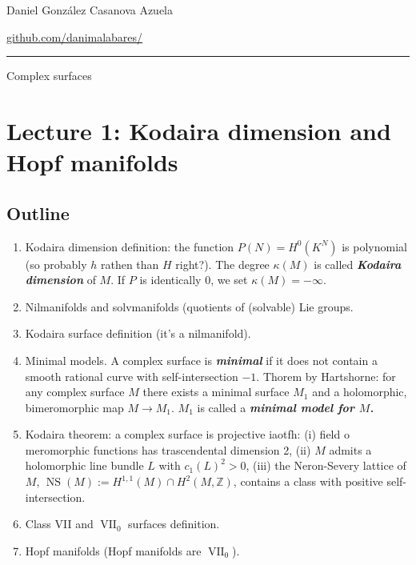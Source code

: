 
%




\begin{minipage}{\textwidth}
	\begin{minipage}{1\textwidth}
		 \hfill Daniel González Casanova Azuela
		
		{\small \hfill\href{https://github.com/danimalabares/}{github.com/danimalabares/}}
	\end{minipage}
\end{minipage}\vspace{.2cm}\hrule

\vspace{10pt}
{\huge Complex surfaces}

\section{Lecture 1: Kodaira dimension and Hopf manifolds}

\subsection{Outline}
\begin{enumerate}
\item Kodaira dimension definition: the function \(P(N)=H^{0}(K^N)\) is polynomial (so probably \(h\) rathen than \(H\) right?). The degree  \(\kappa(M)\) is called \textit{\textbf{Kodaira dimension}} of \(M\). If \(P\) is identically 0, we set \(\kappa(M)=-\infty\).
\item Nilmanifolds and solvmanifolds (quotients of (solvable) Lie groups.
\item Kodaira surface definition (it's a nilmanifold).
\item Minimal models. A complex surface is \textit{\textbf{minimal}} if it does not contain a smooth rational curve with self-intersection \(-1\). Thorem by Hartshorne: for any complex surface \(M\) there exists a minimal surface \(M_1\) and a holomorphic, bimeromorphic map \(M \to M_1\). \(M_1\) is called a \textit{\textbf{minimal model for \(M\).}}
\item Kodaira theorem: a complex surface is projective iaotfh: (i) field o meromorphic functions has trascendental dimension 2, (ii)  \(M\) admits a holomorphic line bundle \(L\) with \(c_1(L)^2>0\), (iii) the Neron-Severy lattice of \(M\), \(\operatorname{NS}(M):=H^{1,1}(M)\cap H^{2}(M,\mathbb{Z})\), contains a class with positive self-intersection. 
\item Class VII and \(\operatorname{V I I}_0\) surfaces definition.
\item Hopf manifolds (Hopf manifolds are \(\operatorname{  V I I}_0\)).
\end{enumerate}

